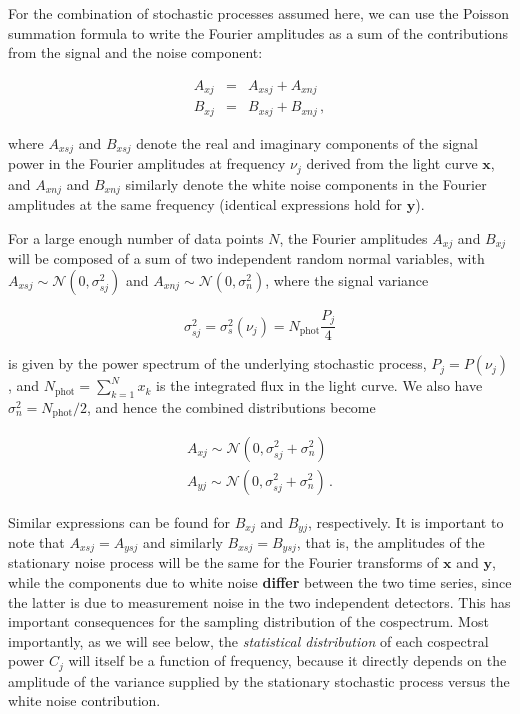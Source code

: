 \documentclass[fleqn,usenatbib]{mnras}
\newcommand{\Normal}{\ensuremath{{\mathcal N}}}
\begin{document}
\noindent For the combination of stochastic processes assumed here,  we can use the Poisson summation formula to write the Fourier amplitudes as a sum of the contributions from the signal and the noise component:

\begin{eqnarray}
A_{xj} &=& A_{xsj} + A_{xnj} \nonumber \\
B_{xj} &=& B_{xsj} + B_{xnj} \, ,
\end{eqnarray}

\noindent where $A_{xsj}$ and $B_{xsj}$ denote the real and imaginary components of the signal power in the Fourier amplitudes at frequency $\nu_j$ derived from the light curve $\mathbf{x}$, and $A_{xnj}$ and $B_{xnj}$ similarly denote the white noise components in the Fourier amplitudes at the same frequency (identical expressions hold for $\mathbf{y}$). 

For a large enough number of data points $N$, the Fourier amplitudes $A_{xj}$ and $B_{xj}$ will be composed of a sum of two independent random normal variables, with $A_{xsj} \sim \Normal(0, \sigma^2_{sj})$ and $A_{xnj} \sim \Normal(0, \sigma^2_n)$, where the signal variance

\begin{equation}
\label{eqn:variance}
\sigma^2_{sj} = \sigma^2_{s}(\nu_j) = N_\mathrm{phot} \frac{P_j}{4}
\end{equation}

\noindent is given by the power spectrum of the underlying stochastic process, $P_j = P(\nu_j)$, and $N_{\mathrm{phot}} = \sum_{k=1}^{N}{x_k}$ is the integrated flux in the light curve. We also have $\sigma^2_n = N_\mathrm{phot}/2$, and hence the combined distributions become

\begin{eqnarray}
A_{xj} \sim \Normal(0, \sigma^2_{sj}+\sigma^2_{n}) \nonumber \\
A_{yj} \sim \Normal(0, \sigma^2_{sj}+\sigma^2_{n}) \, . \nonumber
\end{eqnarray}

\noindent Similar expressions can be found for $B_{xj}$ and $B_{yj}$, respectively. It is important to note that $A_{xsj} = A_{ysj}$ and similarly $B_{xsj} = B_{ysj}$, that is, the amplitudes of the stationary noise process will be the same for the Fourier transforms of $\mathbf{x}$ and $\mathbf{y}$, while the components due to white noise \textbf{differ} between the two time series, since the latter is due to measurement noise in the two independent detectors. This has important consequences for the sampling distribution of the cospectrum. Most importantly, as we will see below, the \textit{statistical distribution} of each cospectral power $C_j$ will itself be a function of frequency,  because it directly depends on the amplitude of the variance supplied by the stationary stochastic process versus the white noise contribution.
\end{document}
